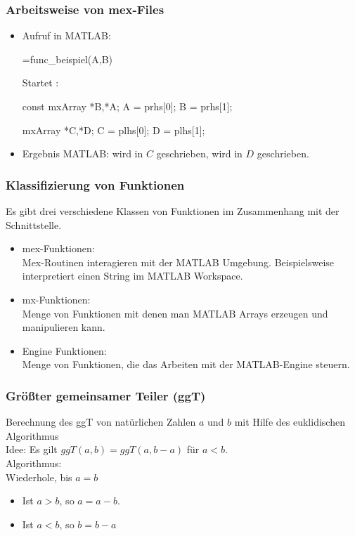 \documentclass[hyperref={xetex}]{beamer}
\begin{document}
%
%
\begin{frame}[fragile]\frametitle{Arbeitsweise von mex-Files}
\begin{itemize}
\item Aufruf in MATLAB:
\begin{matlabin}
[C,D]=func_beispiel(A,B)
\end{matlabin}
Startet :
\begin{matlabin}[language=C++]
const mxArray *B,*A;
A = prhs[0];
B = prhs[1];

mxArray *C,*D;
C = plhs[0];
D = plhs[1];
\end{matlabin} 
\item Ergebnis MATLAB:  wird in $C$ geschrieben, 
  wird in $D$ geschrieben. 
\end{itemize}
\end{frame}

%
% 
\begin{frame}[fragile]\frametitle{Klassifizierung von Funktionen}
\vspace*{-0.5cm}
Es gibt drei verschiedene Klassen von Funktionen im Zusammenhang mit der Schnittstelle.
\begin{itemize}
\item \alert{ mex-Funktionen:}\\
 Mex-Routinen interagieren mit der MATLAB Umgebung. 
Beispielsweise interpretiert  einen String im MATLAB Workspace.  
\item \alert{ mx-Funktionen:} \\
Menge von Funktionen mit 
 denen man MATLAB Arrays erzeugen und manipulieren kann. 
\item \alert{ Engine Funktionen:}\\ 
 Menge von Funktionen, die das Arbeiten mit der MATLAB-Engine steuern. 
\end{itemize}
\end{frame}
%
%
%
\begin{frame}[fragile]\frametitle{Gr\"o{\ss}ter gemeinsamer Teiler (ggT)}
Berechnung des ggT von nat\"urlichen Zahlen $a$ und $b$ mit Hilfe des
euklidischen Algorithmus\\[1cm]

\alert{Idee:} Es gilt \alert{ $ggT(a,b)=ggT(a,b-a)$} f\"ur $a<b$.\\[1cm]

\alert{Algorithmus:} \\
Wiederhole,  bis $a=b$
\begin{itemize}
\item Ist $a>b$, so $a=a-b$.
\item Ist $a<b$, so $b=b-a$ 
\end{itemize}
\end{frame}
\end{document}
